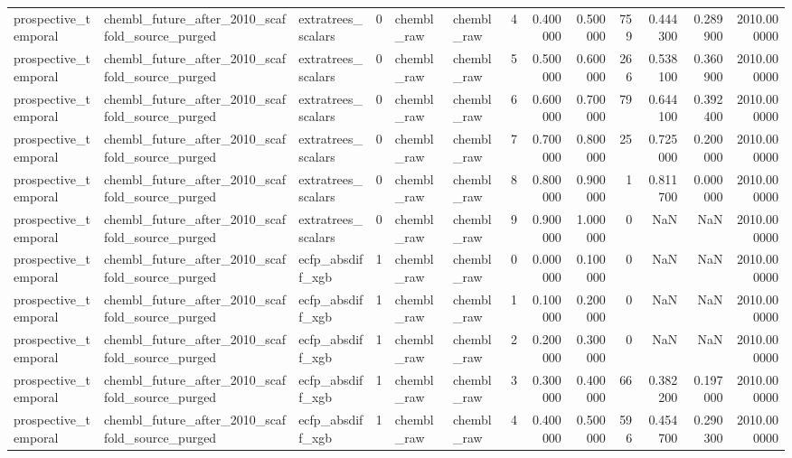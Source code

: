\begin{longtable}{lllrllrrrrrrr}
prospective\_temporal & chembl\_future\_after\_2010\_scaffold\_source\_purged & extratrees\_scalars & 0 & chembl\_raw & chembl\_raw & 4 & 0.400000 & 0.500000 & 759 & 0.444300 & 0.289900 & 2010.000000 \\
prospective\_temporal & chembl\_future\_after\_2010\_scaffold\_source\_purged & extratrees\_scalars & 0 & chembl\_raw & chembl\_raw & 5 & 0.500000 & 0.600000 & 266 & 0.538100 & 0.360900 & 2010.000000 \\
prospective\_temporal & chembl\_future\_after\_2010\_scaffold\_source\_purged & extratrees\_scalars & 0 & chembl\_raw & chembl\_raw & 6 & 0.600000 & 0.700000 & 79 & 0.644100 & 0.392400 & 2010.000000 \\
prospective\_temporal & chembl\_future\_after\_2010\_scaffold\_source\_purged & extratrees\_scalars & 0 & chembl\_raw & chembl\_raw & 7 & 0.700000 & 0.800000 & 25 & 0.725000 & 0.200000 & 2010.000000 \\
prospective\_temporal & chembl\_future\_after\_2010\_scaffold\_source\_purged & extratrees\_scalars & 0 & chembl\_raw & chembl\_raw & 8 & 0.800000 & 0.900000 & 1 & 0.811700 & 0.000000 & 2010.000000 \\
prospective\_temporal & chembl\_future\_after\_2010\_scaffold\_source\_purged & extratrees\_scalars & 0 & chembl\_raw & chembl\_raw & 9 & 0.900000 & 1.000000 & 0 & NaN & NaN & 2010.000000 \\
prospective\_temporal & chembl\_future\_after\_2010\_scaffold\_source\_purged & ecfp\_absdiff\_xgb & 1 & chembl\_raw & chembl\_raw & 0 & 0.000000 & 0.100000 & 0 & NaN & NaN & 2010.000000 \\
prospective\_temporal & chembl\_future\_after\_2010\_scaffold\_source\_purged & ecfp\_absdiff\_xgb & 1 & chembl\_raw & chembl\_raw & 1 & 0.100000 & 0.200000 & 0 & NaN & NaN & 2010.000000 \\
prospective\_temporal & chembl\_future\_after\_2010\_scaffold\_source\_purged & ecfp\_absdiff\_xgb & 1 & chembl\_raw & chembl\_raw & 2 & 0.200000 & 0.300000 & 0 & NaN & NaN & 2010.000000 \\
prospective\_temporal & chembl\_future\_after\_2010\_scaffold\_source\_purged & ecfp\_absdiff\_xgb & 1 & chembl\_raw & chembl\_raw & 3 & 0.300000 & 0.400000 & 66 & 0.382200 & 0.197000 & 2010.000000 \\
prospective\_temporal & chembl\_future\_after\_2010\_scaffold\_source\_purged & ecfp\_absdiff\_xgb & 1 & chembl\_raw & chembl\_raw & 4 & 0.400000 & 0.500000 & 596 & 0.454700 & 0.290300 & 2010.000000 \\

\end{longtable}
